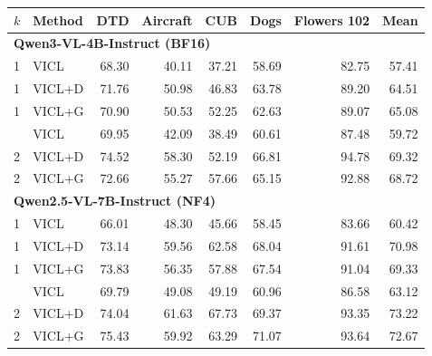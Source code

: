 \begin{tabular}{llrrrrrr}
\toprule
$k$ & Method & DTD & Aircraft & CUB & Dogs & Flowers 102 & Mean \\
\midrule
\multicolumn{8}{l}{\textbf{Qwen3-VL-4B-Instruct (BF16)}} \\
1 & VICL & 68.30 & 40.11 & 37.21 & 58.69 & 82.75 & 57.41 \\
1 & VICL+D & 71.76 & 50.98 & 46.83 & 63.78 & 89.20 & 64.51 \\
1 & VICL+G & 70.90 & 50.53 & 52.25 & 62.63 & 89.07 & 65.08 \\
\addlinespace[2pt]
2 & VICL & 69.95 & 42.09 & 38.49 & 60.61 & 87.48 & 59.72 \\
2 & VICL+D & 74.52 & 58.30 & 52.19 & 66.81 & 94.78 & 69.32 \\
2 & VICL+G & 72.66 & 55.27 & 57.66 & 65.15 & 92.88 & 68.72 \\
\midrule
\multicolumn{8}{l}{\textbf{Qwen2.5-VL-7B-Instruct (NF4)}} \\
1 & VICL & 66.01 & 48.30 & 45.66 & 58.45 & 83.66 & 60.42 \\
1 & VICL+D & 73.14 & 59.56 & 62.58 & 68.04 & 91.61 & 70.98 \\
1 & VICL+G & 73.83 & 56.35 & 57.88 & 67.54 & 91.04 & 69.33 \\
\addlinespace[2pt]
2 & VICL & 69.79 & 49.08 & 49.19 & 60.96 & 86.58 & 63.12 \\
2 & VICL+D & 74.04 & 61.63 & 67.73 & 69.37 & 93.35 & 73.22 \\
2 & VICL+G & 75.43 & 59.92 & 63.29 & 71.07 & 93.64 & 72.67 \\
\bottomrule
\end{tabular}
